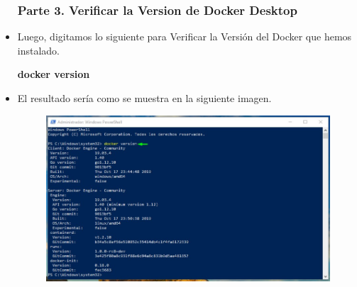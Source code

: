 \begin{itemize}
			\subsubsection{Parte 3. Verificar la Version de Docker Desktop}
				\item Luego, digitamos lo siguiente para Verificar la Versión del Docker que hemos instalado.
					\begin{center}
						\textbf{docker version} \\
					\end{center}
				\item El resultado sería como se muestra en la siguiente imagen.
					\begin{figure}[htb]
						\begin{center}
							\includegraphics[width=16cm]{./Imagenes/VersionDocker}
						\end{center}
					\end{figure}
					\vspace{10cm}

\end{itemize}
